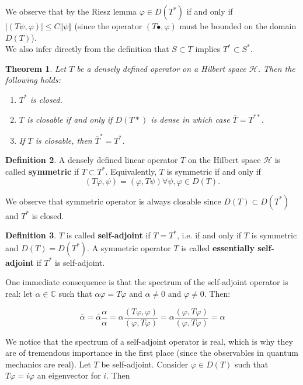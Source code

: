 \documentclass[11pt, a4paper, german]{article}
\theoremstyle{plain}
\newtheorem{theorem}{Theorem}
\theoremstyle{definition}
\newtheorem{definition}[theorem]{Definition}
\theoremstyle{remark}
\numberwithin{equation}{section}
\numberwithin{theorem}{section}
\DeclareMathOperator{\Forall}{\forall}
\begin{document}
We observe that by the Riesz lemma $\varphi \in D(T^*)$ if and only if $|(T\psi, \varphi)|\leq C\Vert\psi\Vert$ (since the operator $(T \bullet, \varphi)$ must be bounded on the domain $D(T)$).\\

We also infer directly from the definition that $S\subset T$ implies $T^*\subset S^*$.

\begin{theorem}
Let $T$ be a densely defined operator on a Hilbert space $\mathcal{H}$. Then the following holds:
\begin{enumerate}
\item $T^*$ is closed.
\item $T$ is closable if and only if $D(T*)$ is dense in which case $\overline T = T ^{**}$.
\item If $T$ is closable, then $\overline T ^* = T ^*$.
\end{enumerate}
\end{theorem}

\begin{definition}
A densely defined linear operator $T$ on the Hilbert space $\mathcal{H}$ is called \textbf{symmetric} if $T\subset T^*$. Equivalently, $T$ is symmetric if and only if $$(T\varphi, \psi) = (\varphi, T\psi) \Forall \psi, \varphi \in D(T).$$
\end{definition}

We observe that symmetric operator is always closable since $D(T)\subset D(T^*)$ and $T^*$ is closed.

\begin{definition}
$T$ is called \textbf{self-adjoint} if $T = T^*$, i.e. if and only if $T$ is symmetric and $D(T) = D(T^*)$. A symmetric operator $T$ is called \textbf{essentially self-adjoint} if $T^*$ is self-adjoint.
\end{definition}

One immediate consequence is that the spectrum of the self-adjoint operator is real: let $\alpha \in \mathbb C $ such that $\alpha \varphi = T \varphi$ and $\alpha \neq 0$ and $\varphi \neq 0$. Then:

\begin{equation}
\overline \alpha = \overline \alpha \frac \alpha \alpha = \alpha \frac{(T\varphi, \varphi)}{(\varphi, T\varphi)} = \alpha \frac{(\varphi, T\varphi)}{(\varphi, T\varphi)} = \alpha
\end{equation}

We notice that the spectrum of a self-adjoint operator is real, which is why they are of tremendous importance in the first place (since the observables in quantum mechanics are real). Let $T$ be self-adjoint. Consider $\varphi \in D(T)$ such that $T\varphi=i\varphi$ an eigenvector for $i$. Then
\end{document}
